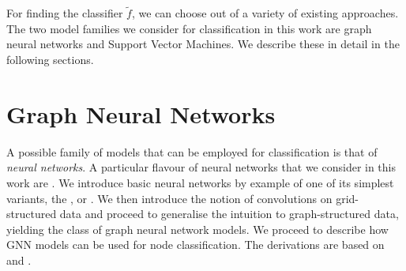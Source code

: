 \documentclass[
	fontsize=10pt, %
	twoside=false, %
	secnumdepth=1, %
  toc=indentunnumbered %
]{kaobook}
\begin{document}
For finding the classifier $\tilde f$, we can choose out of a variety of
existing approaches. The two model families we consider for classification in
this work are graph neural networks and Support Vector Machines. We describe
these in detail in the following sections.






\section{Graph Neural Networks}
\label{sec:neural-networks}



A possible family of models that can be employed for classification is that of
\textit{neural networks}. A particular flavour of neural networks that we
consider in this work are . We introduce basic neural
networks by example of one of its simplest variants, the , or . We then
introduce the notion of convolutions on grid-structured data and proceed to
generalise the intuition to graph-structured data, yielding the class of graph
neural network models. We proceed to describe how GNN models can be used for
node classification. The derivations are based on \citeauthor{zhang_dive_nodate}
\cite{zhang_dive_nodate} and \citeauthor{bronstein_geometric_2021}
\cite{bronstein_geometric_2021}.
\end{document}
